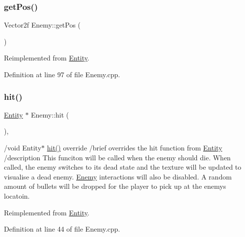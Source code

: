 \mbox{\label{class_enemy_a65af045027f5fd7396b420f0d4c34dac}} 
\subsubsection{\texorpdfstring{get\+Pos()}{getPos()}}
{\footnotesize\ttfamily Vector2f Enemy\+::get\+Pos (\begin{DoxyParamCaption}{ }\end{DoxyParamCaption})\hspace{0.3cm}{\ttfamily [virtual]}}



Reimplemented from \hyperlink{class_entity_a8b6080f0ab76702fcd00108aef8ea9dd}{Entity}.



Definition at line 97 of file Enemy.\+cpp.

\mbox{\label{class_enemy_a6cb8f8dbec88de9b2e95643709e349a3}} 
\subsubsection{\texorpdfstring{hit()}{hit()}}
{\footnotesize\ttfamily \hyperlink{class_entity}{Entity} $\ast$ Enemy\+::hit (\begin{DoxyParamCaption}{ }\end{DoxyParamCaption})\hspace{0.3cm}{\ttfamily [override]}, {\ttfamily [virtual]}}

/void Entity$\ast$ \hyperlink{class_enemy_a6cb8f8dbec88de9b2e95643709e349a3}{hit()} override /brief overrides the hit function from \hyperlink{class_entity}{Entity} /description This funciton will be called when the enemy should die. When called, the enemy switches to it\textquotesingle{}s dead state and the texture will be updated to visualise a dead enemy. \hyperlink{class_enemy}{Enemy} interactions will also be disabled. A random amount of bullets will be dropped for the player to pick up at the enemy\textquotesingle{}s locatoin. 

Reimplemented from \hyperlink{class_entity_a29117f3f40e7069d5d4c1b2fca7819d6}{Entity}.



Definition at line 44 of file Enemy.\+cpp.

\mbox{\label{class_enemy_aefbc9a7b2370957331e608932c458b52}} 
